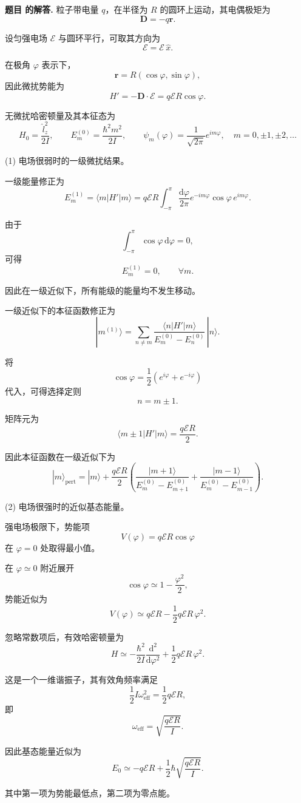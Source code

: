 \documentclass[12pt, a4paper, oneside]{ctexart}
\newcounter{problemname}
\newenvironment{solution}
  {\par\noindent\textbf{题目 \theproblemname 的解答. }}
  {\par}
\begin{document}
\begin{solution}
  粒子带电量 $q$，在半径为 $R$ 的圆环上运动，其电偶极矩为
\[
\mathbf D = -q\mathbf r.
\]

设匀强电场 $\boldsymbol{\mathcal E}$ 与圆环平行，可取其方向为
\[
\boldsymbol{\mathcal E} = \mathcal E\,\hat x .
\]

在极角 $\varphi$ 表示下，
\[
\mathbf r = R(\cos\varphi,\sin\varphi),
\]
因此微扰势能为
\[
H' = -\mathbf D\cdot\boldsymbol{\mathcal E}
= q\mathcal E R\cos\varphi .
\]

无微扰哈密顿量及其本征态为
\[
H_0=\frac{\hat l_z^2}{2I},
\qquad
E_m^{(0)}=\frac{\hbar^2 m^2}{2I},
\qquad
\psi_m(\varphi)=\frac{1}{\sqrt{2\pi}}e^{im\varphi},
\quad m=0,\pm1,\pm2,\dots
\]


(1) 电场很弱时的一级微扰结果。

一级能量修正为
\[
E_m^{(1)}=\langle m|H'|m\rangle
=q\mathcal E R
\int_{-\pi}^{\pi}\frac{\mathrm d\varphi}{2\pi}
e^{-im\varphi}\cos\varphi\,e^{im\varphi}.
\]

由于
\[
\int_{-\pi}^{\pi}\cos\varphi\,\mathrm d\varphi = 0,
\]
可得
\[
E_m^{(1)}=0,
\qquad \forall m.
\]

因此在一级近似下，所有能级的能量均不发生移动。

一级近似下的本征函数修正为
\[
|m^{(1)}\rangle
=\sum_{n\neq m}
\frac{\langle n|H'|m\rangle}
{E_m^{(0)}-E_n^{(0)}}\,|n\rangle.
\]

将
\[
\cos\varphi=\frac{1}{2}(e^{i\varphi}+e^{-i\varphi})
\]
代入，可得选择定则
\[
n = m\pm1.
\]

矩阵元为
\[
\langle m\pm1|H'|m\rangle
=\frac{q\mathcal E R}{2}.
\]

因此本征函数在一级近似下为
\[
|m\rangle_{\text{pert}}
=|m\rangle
+\frac{q\mathcal E R}{2}
\left(
\frac{|m+1\rangle}{E_m^{(0)}-E_{m+1}^{(0)}}
+\frac{|m-1\rangle}{E_m^{(0)}-E_{m-1}^{(0)}}
\right).
\]


(2) 电场很强时的近似基态能量。

强电场极限下，势能项
\[
V(\varphi)=q\mathcal E R\cos\varphi
\]
在 $\varphi=0$ 处取得最小值。

在 $\varphi\simeq0$ 附近展开
\[
\cos\varphi\simeq1-\frac{\varphi^2}{2},
\]
势能近似为
\[
V(\varphi)\simeq
q\mathcal E R
-\frac{1}{2}q\mathcal E R\,\varphi^2.
\]

忽略常数项后，有效哈密顿量为
\[
H\simeq
-\frac{\hbar^2}{2I}\frac{\mathrm d^2}{\mathrm d\varphi^2}
+\frac{1}{2}q\mathcal E R\,\varphi^2.
\]

这是一个一维谐振子，其有效角频率满足
\[
\frac{1}{2}I\omega_{\text{eff}}^2
=\frac{1}{2}q\mathcal E R,
\]
即
\[
\omega_{\text{eff}}=\sqrt{\frac{q\mathcal E R}{I}}.
\]

因此基态能量近似为
\[
E_0\simeq
-q\mathcal E R
+\frac{1}{2}\hbar\sqrt{\frac{q\mathcal E R}{I}}.
\]

其中第一项为势能最低点，第二项为零点能。

\end{solution}
\end{document}
